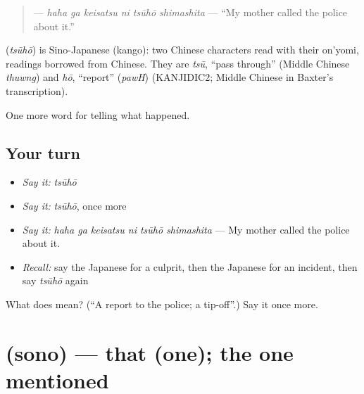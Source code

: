 \begin{quote}
\textbf{  } — \emph{haha ga keisatsu ni tsūhō shimashita} — \textquotedblleft{}My mother called the police about it.\textquotedblright{}
\end{quote}

\begin{cousinweb}
\textbf{} (\emph{tsūhō}) is Sino-Japanese (kango): two Chinese characters read with their on'yomi, readings borrowed from Chinese. They are \emph{tsū}, \textquotedblleft{}pass through\textquotedblright{} (Middle Chinese \emph{thuwng}) and \emph{hō}, \textquotedblleft{}report\textquotedblright{} (\emph{pawH}) (KANJIDIC2; Middle Chinese in Baxter's transcription).
\end{cousinweb}

\begin{grammarlens}[title={What you've built}]
One more word for telling what happened.
\end{grammarlens}

\subsection*{Your turn}
\begin{itemize}
\raggedright
  \item \emph{Say it:} \emph{tsūhō}
  \item \emph{Say it:} \emph{tsūhō}, once more
  \item \emph{Say it:} \emph{haha ga keisatsu ni tsūhō shimashita} — My mother called the police about it.
  \item \emph{Recall:} say the Japanese for a culprit, then the Japanese for an incident, then say \emph{tsūhō} again
\end{itemize}

\begin{tcolorbox}[breakable,colback=teal!4,colframe=teal!35!black,title={Before you move on}]
What does  mean? (\textquotedblleft{}A report to the police; a tip-off\textquotedblright{}.) Say it once more.
\end{tcolorbox}
\section[\texorpdfstring{\ja{その} (sono)}{その (sono)}]{ (sono) — that (one); the one mentioned}

\label{lesson:JA-C270-sono}



